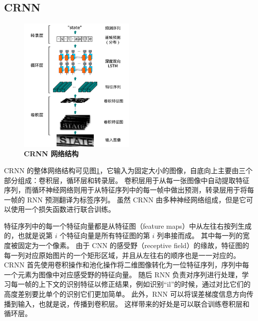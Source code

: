 \subsection{CRNN}
\label{crnn}

\begin{figure}[h!]
	\centering
	\includegraphics[width=0.5\textwidth]{figure/resources/CRNN_arch.png}
	\caption{\textbf{CRNN 网络结构}\label{CRNN_arch}}
\end{figure}

CRNN 的整体网络结构可见图\ref{CRNN_arch}，它输入为固定大小的图像，自底向上主要由三个部分组成：卷积层，循环层和转录层。
卷积层用于从每一张图像中自动提取特征序列，而循环神经网络则用于从特征序列中的每一帧中做出预测，转录层用于将每一帧的 RNN 预测翻译为标签序列。
虽然 CRNN 由多种神经网络组成，但是它可以使用一个损失函数进行联合训练。

特征序列中的每一个特征向量都是从特征图（feature maps）中从左往右按列生成的，也就是说第 $i$ 个特征向量是所有特征图的第 $i$ 列串接而成。
其中每一列的宽度被固定为一个像素。
由于 CNN 的感受野（receptive field）的缘故，特征图的每一列对应原始图片的一个矩形区域，并且从左往右的顺序也是一一对应的。
CRNN 首先使用卷积操作和池化操作将二维图像转化为一位特征序列，序列中每一个元素为图像中对应感受野的特征向量。
随后 RNN 负责对序列进行处理，学习每一帧的上下文的识别特征以修正结果，例如识别“il”的时候，通过对比它们的高度差别要比单个的识别它们更加简单。
此外，RNN 可以将误差梯度信息方向传播到输入，也就是说，传播到卷积层。
这样带来的好处是可以联合训练卷积层和循环层。

